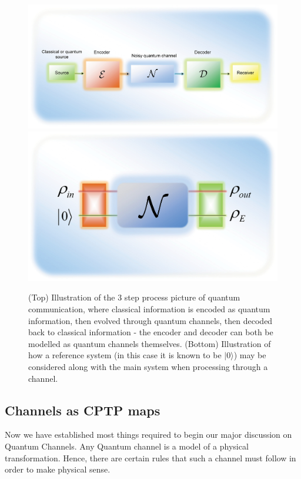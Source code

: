 \begin{figure}
    \centering
    \includegraphics[scale=0.15]{figures/channel1.png}
    \includegraphics[scale=0.12]{figures/channel2.png}
    \caption{(Top) Illustration of the 3 step process picture of quantum communication, where classical
    information is encoded as quantum information, then evolved through quantum channels, then decoded
    back to classical information - the encoder and decoder can both be modelled as quantum channels
    themselves. (Bottom) Illustration of how a reference system (in this case it is known to be $|0\rangle$)
    may be considered along with the main system when processing through a channel.}
    \label{channelimg}
\end{figure}

\subsection{Channels as CPTP maps}

Now we have established most things required to begin our major discussion on Quantum Channels. Any
Quantum channel is a model of a physical transformation. Hence, there are certain rules that such a
channel must follow in order to make physical sense.

